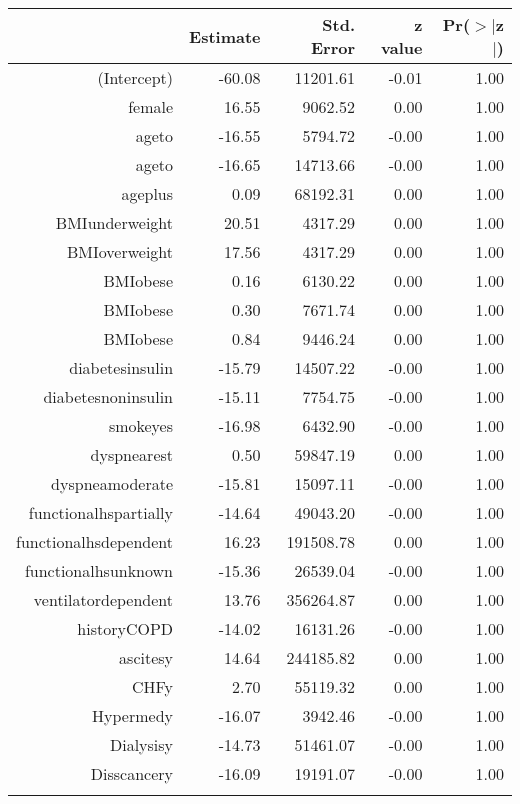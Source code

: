 \bigskip\bigskip
\centering
\begin{tabular}{rrrrr}
  \hline
 & Estimate & Std. Error & z value & Pr($>$$|$z$|$) \\ 
  \hline
(Intercept) & -60.08 & 11201.61 & -0.01 & 1.00 \\ 
  female & 16.55 & 9062.52 & 0.00 & 1.00 \\ 
  age\-65\-to\-74 & -16.55 & 5794.72 & -0.00 & 1.00 \\ 
  age\-75\-to\-84 & -16.65 & 14713.66 & -0.00 & 1.00 \\ 
  age\-85\-plus & 0.09 & 68192.31 & 0.00 & 1.00 \\ 
  BMI\-underweight & 20.51 & 4317.29 & 0.00 & 1.00 \\ 
  BMI\-overweight & 17.56 & 4317.29 & 0.00 & 1.00 \\ 
  BMI\-obese\-1 & 0.16 & 6130.22 & 0.00 & 1.00 \\ 
  BMI\-obese\-2 & 0.30 & 7671.74 & 0.00 & 1.00 \\ 
  BMI\-obese\-3 & 0.84 & 9446.24 & 0.00 & 1.00 \\ 
  diabetes\-insulin & -15.79 & 14507.22 & -0.00 & 1.00 \\ 
  diabetes\-noninsulin & -15.11 & 7754.75 & -0.00 & 1.00 \\ 
  smoke\-yes & -16.98 & 6432.90 & -0.00 & 1.00 \\ 
  dyspnea\-rest & 0.50 & 59847.19 & 0.00 & 1.00 \\ 
  dyspnea\-moderate & -15.81 & 15097.11 & -0.00 & 1.00 \\ 
  functional\-hs\-partially & -14.64 & 49043.20 & -0.00 & 1.00 \\ 
  functional\-hs\-dependent & 16.23 & 191508.78 & 0.00 & 1.00 \\ 
  functional\-hs\-unknown & -15.36 & 26539.04 & -0.00 & 1.00 \\ 
  ventilator\-dependent & 13.76 & 356264.87 & 0.00 & 1.00 \\ 
  history\-COPD & -14.02 & 16131.26 & -0.00 & 1.00 \\ 
  ascites\-y & 14.64 & 244185.82 & 0.00 & 1.00 \\ 
  CHF\-y & 2.70 & 55119.32 & 0.00 & 1.00 \\ 
  Hyper\-med\-y & -16.07 & 3942.46 & -0.00 & 1.00 \\ 
  Dialysis\-y & -14.73 & 51461.07 & -0.00 & 1.00 \\ 
  Diss\-cancer\-y & -16.09 & 19191.07 & -0.00 & 1.00 \\ 
$$
\end{tabular}

